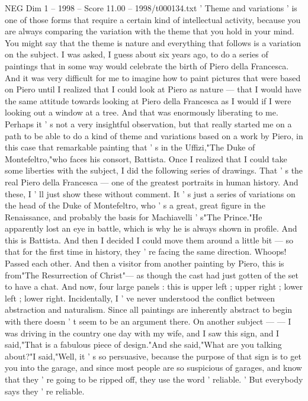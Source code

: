 \begin{textsample}{NEG Dim 1 – 1998 – Score 11.00 – 1998/t000134.txt}  \label{ex:f1_neg_067}
' Theme and variations ' is one of those forms that require a certain kind of intellectual activity, because you are always comparing the variation with the theme that you hold in your mind.
You might say that the theme is nature and everything that follows is a variation on the subject.
I was asked, I guess about six years ago, to do a series of paintings that in some way would celebrate the birth of Piero della Francesca.
And it was very difficult for me to imagine how to paint pictures that were based on Piero until I realized that I could look at Piero as nature — that I would have the same attitude towards looking at Piero della Francesca as I would if I were looking out a window at a tree.
And that was enormously liberating to me.
Perhaps it ' s not a very insightful observation, but that really started me on a path to be able to do a kind of theme and variations based on a work by Piero, in this case that remarkable painting that ' s in the Uffizi,"The Duke of Montefeltro,"who faces his consort, Battista.
Once I realized that I could take some liberties with the subject, I did the following series of drawings.
That ' s the real Piero della Francesca — one of the greatest portraits in human history.
And these, I ' ll just show these without comment.
It ' s just a series of variations on the head of the Duke of Montefeltro, who ' s a great, great figure in the Renaissance, and probably the basis for Machiavelli ' s"The Prince."He apparently lost an eye in battle, which is why he is always shown in profile.
And this is Battista.
And then I decided I could move them around a little bit — so that for the first time in history, they ' re facing the same direction.
Whoops!
Passed each other.
And then a visitor from another painting by Piero, this is from"The Resurrection of Christ"— as though the cast had just gotten of the set to have a chat.
And now, four large panels : this is upper left ; upper right ; lower left ; lower right.
Incidentally, I ' ve never understood the conflict between abstraction and naturalism.
Since all paintings are inherently abstract to begin with there doesn ' t seem to be an argument there.
On another subject — — I was driving in the country one day with my wife, and I saw this sign, and I said,"That is a fabulous piece of design."And she said,"What are you talking about?"I said,"Well, it ' s so persuasive, because the purpose of that sign is to get you into the garage, and since most people are so suspicious of garages, and know that they ' re going to be ripped off, they use the word ' reliable. ' But everybody says they ' re reliable.

\end{textsample}
